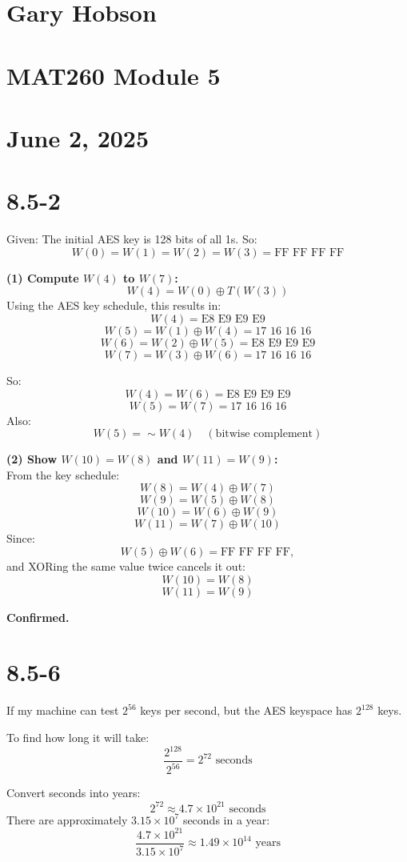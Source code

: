 \documentclass[12pt]{article}
\begin{document}
\section*{Gary Hobson}
\section*{MAT260 Module 5}
\section*{June 2, 2025}
\newpage



\section*{8.5-2}
Given: The initial AES key is 128 bits of all 1s. So:
\[
W(0) = W(1) = W(2) = W(3) = \text{FF FF FF FF}
\]

\textbf{(1) Compute \( W(4) \) to \( W(7) \):} \\
\[
W(4) = W(0) \oplus T(W(3))
\]
Using the AES key schedule, this results in:
\[
W(4) = \text{E8 E9 E9 E9}
\]
\[
W(5) = W(1) \oplus W(4) = \text{17 16 16 16}
\]
\[
W(6) = W(2) \oplus W(5) = \text{E8 E9 E9 E9}
\]
\[
W(7) = W(3) \oplus W(6) = \text{17 16 16 16}
\]

So:
\[
W(4) = W(6) = \text{E8 E9 E9 E9}
\]
\[
W(5) = W(7) = \text{17 16 16 16}
\]
Also:
\[
W(5) = \sim W(4) \quad (\text{bitwise complement})
\]

\textbf{(2) Show \( W(10) = W(8) \) and \( W(11) = W(9) \):} \\
From the key schedule:
\[
W(8) = W(4) \oplus W(7)
\]
\[
W(9) = W(5) \oplus W(8)
\]
\[
W(10) = W(6) \oplus W(9)
\]
\[
W(11) = W(7) \oplus W(10)
\]
Since:
\[
W(5) \oplus W(6) = \text{FF FF FF FF},
\]
and XORing the same value twice cancels it out:
\[
W(10) = W(8)
\]
\[
W(11) = W(9)
\]

\textbf{Confirmed.}

\newpage



\section*{8.5-6}
If my machine can test \( 2^{56} \) keys per second, but the AES keyspace has \( 2^{128} \) keys.

To find how long it will take:
\[
\frac{2^{128}}{2^{56}} = 2^{72} \text{ seconds}
\]

Convert seconds into years:
\[
2^{72} \approx 4.7 \times 10^{21} \text{ seconds}
\]
There are approximately \( 3.15 \times 10^{7} \) seconds in a year:
\[
\frac{4.7 \times 10^{21}}{3.15 \times 10^{7}} \approx 1.49 \times 10^{14} \text{ years}
\]
\end{document}
